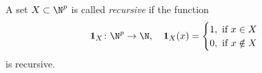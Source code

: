 

\setcounter{section}{3}
\setcounter{subsection}{4}
\setcounter{dfn}{26}

\begin{dfn}
A set $X \subset \N^p$ is called \emph{recursive} if the function
\[
\mathbf{1}_X \colon \N^p \to \N, \quad \mathbf{1}_X(x) =
\begin{cases}
1, \text{ if }x \in X\\
0, \text{ if }x \notin X
\end{cases}
\]
is recursive.
\end{dfn}

